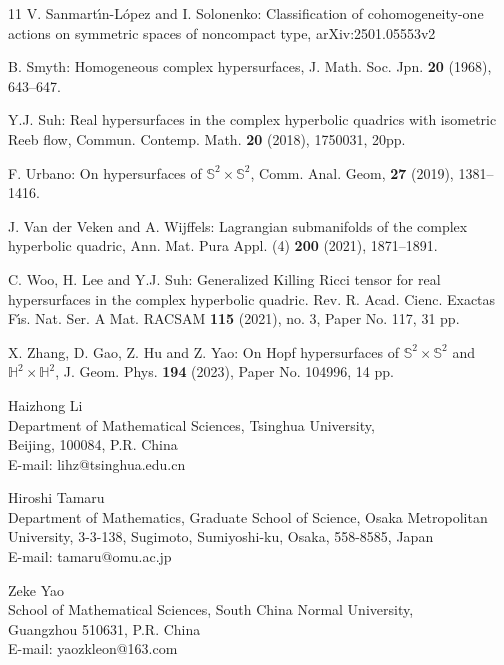 \documentclass[reqno]{amsart}%
\theoremstyle{definition}
\numberwithin{equation}{section}
\begin{document}
\begin{thebibliography}{11}
V. Sanmart\'{\i}n-L\'{o}pez and I. Solonenko: 
Classification of cohomogeneity-one actions on symmetric spaces of noncompact type, 
arXiv:2501.05553v2


B. Smyth:
Homogeneous complex hypersurfaces,
J. Math. Soc. Jpn. {\bf20} (1968), 643--647.






Y.J. Suh:
Real hypersurfaces in the complex hyperbolic quadrics with isometric Reeb flow,
Commun. Contemp. Math. {\bf 20} (2018), 1750031, 20pp.


F. Urbano:
On hypersurfaces of $\mathbb{S}^2\times \mathbb{S}^2$,
Comm. Anal. Geom, {\bf 27} (2019), 1381--1416. 

J. Van der Veken and A. Wijffels:
Lagrangian submanifolds of the complex hyperbolic quadric,
Ann. Mat. Pura Appl. (4) {\bf 200} (2021), 1871--1891.

C. Woo, H. Lee and Y.J. Suh:
Generalized Killing Ricci tensor for real hypersurfaces in the complex hyperbolic quadric.
Rev. R. Acad. Cienc. Exactas F\'{\i}s. Nat. Ser. A Mat. RACSAM {\bf115} (2021), no. 3, Paper No. 117, 31 pp.

X. Zhang, D. Gao, Z. Hu and Z. Yao:
On Hopf hypersurfaces of $\mathbb{S}^2\times \mathbb{S}^2$ and $\mathbb{H}^2\times \mathbb{H}^2$,
J. Geom. Phys. {\bf 194} (2023), Paper No. 104996, 14 pp.

\end{thebibliography}

\vskip 10mm

\begin{flushleft}
Haizhong Li\\
{\sc Department of Mathematical Sciences, Tsinghua University,\\
Beijing, 100084, P.R. China}\\
E-mail: lihz@tsinghua.edu.cn

\vskip 1mm

Hiroshi Tamaru\\
{\sc Department of Mathematics, Graduate School of Science, Osaka Metropolitan University,
3-3-138, Sugimoto, Sumiyoshi-ku, Osaka, 558-8585, Japan}\\
E-mail: tamaru@omu.ac.jp

\vskip 1mm

Zeke Yao\\
{\sc School of Mathematical Sciences, South China Normal University,\\
Guangzhou 510631, P.R. China}\\
E-mail: yaozkleon@163.com

\end{flushleft}
\end{document}
